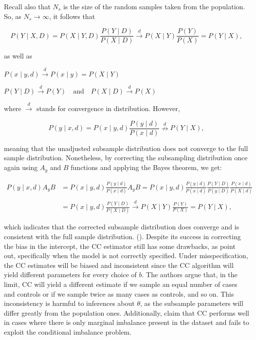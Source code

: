 Recall also that $N_s$ is the size of the random samples taken from the population. So, as $N_s \rightarrow \infty$, it follows that

\begin{equation}
    P(Y \mid X, D)=P(X \mid Y, D) \frac{P(Y \mid D)}{P(X \mid D)} \stackrel{d}{\rightarrow} P(X \mid Y) \frac{P(Y)}{P(X)}=P(Y \mid X),
\end{equation}

as well as 

\begin{center}
    $P(x \mid y, d) \stackrel{d}{\rightarrow} P(x \mid y) = P(X \mid Y)$
\end{center}

\begin{center}
    $P(Y \mid D) \stackrel{d}{\rightarrow} P(Y) \quad \text{and} \quad
    P(X \mid D) \stackrel{d}{\rightarrow} P(X)$
\end{center}

where $\stackrel{d}{\rightarrow}$ stands for convergence in distribution. However, 

\begin{equation}
    P(y \mid x, d)=P(x \mid y, d) \frac{P(y \mid d)}{P(x \mid d)} \stackrel{d}{\nrightarrow} P(Y \mid X),
\end{equation}

meaning that the unadjusted subsample distribution does not converge to the full sample distribution. Nonetheless, by correcting the subsampling distribution once again using $A_y$ and $B$ functions and applying the Bayes theorem, we get:

\begin{align}
     \nonumber P(y \mid x, d) A_y B &= P(x \mid y,d) \frac{P(y \mid d)}{P(x \mid d)} A_y B = P(x \mid y,d) \frac{P(y \mid d)}{P(x \mid d)} \frac{P(Y \mid D)}{P(y \mid D)} \frac{P(x \mid d)}{P(X \mid d)} \\
     \nonumber\\
     & = P(x \mid y,d) \frac{P(Y \mid D)}{P(X \mid D)} \stackrel{d}{\rightarrow} P(X \mid Y) \frac{P(Y)}{P(X)} = P(Y \mid X),   
\end{align}

which indicates that the corrected subsample distribution does converge and is consistent with the full sample distribution. (\cite{king2001logistic}). Despite its success in correcting the bias in the intercept, the CC estimator still has some drawbacks, as \textcite{hastie2014} point out, specifically when the model is not correctly specified. Under misspecification, the CC estimates will be biased and inconsistent since the CC algorithm will yield different parameters for every choice of $b$. The authors argue that, in the limit, CC will yield a different estimate if we sample an equal number of cases and controls or if we sample twice as many cases as controls, and so on. This inconsistency is harmful to inferences about $\theta$, as the subsample parameters will differ greatly from the population ones. Additionally, \textcite{hastie2014} claim that CC performs well in cases where there is only marginal imbalance present in the dataset and fails to exploit the conditional imbalance problem. 

